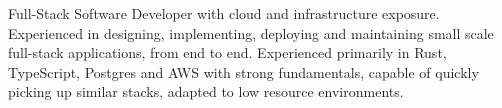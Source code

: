 Full-Stack Software Developer with cloud and infrastructure exposure. Experienced in designing, implementing, deploying and maintaining small scale full-stack applications, from end to end. Experienced primarily in Rust, TypeScript, Postgres and AWS with strong fundamentals, capable of quickly picking up similar stacks, adapted to low resource environments. 